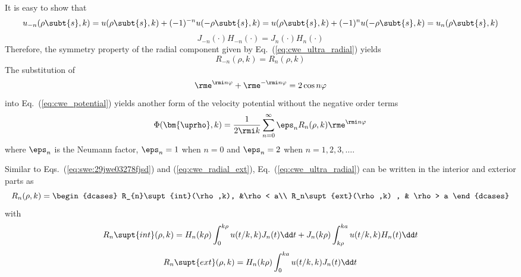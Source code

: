 It is easy to show that 
\begin{equation}
    u_{-n}(\rho\subt{s},k) = u(\rho\subt{s},k) + (-1)^{-n} u(-\rho\subt{s},k)
    = u(\rho\subt{s},k) + (-1)^n u(-\rho\subt{s},k) = u_n(\rho\subt{s},k)
    \label{eq:8923asjdf}
\end{equation}
\begin{equation}
    J_{-n}(\cdot) H_{-n}(\cdot) = J_n(\cdot)H_n(\cdot)
    \label{eq:1289fjws9d8f}
\end{equation}
Therefore, the symmetry property of the radial component given by Eq.~(\ref{eq:cwe_ultra_radial}) yields
\begin{equation}
    R_{-n}(\rho,k) = R_n(\rho,k)
    \label{eq:rad:2930fjwsd}
\end{equation}
The substitution of
\begin{equation}
    \rme^{\rmi n \varphi} + \rme^{-\rmi n \varphi } = 2\cos n\varphi
\end{equation}
into Eq.~(\ref{eq:cwe_potential}) yields another form of the velocity potential without the negative order terms
\begin{equation}
    \Phi(\bm{\uprho},k)
    =\frac{1}{2\rmi k}
    \sum_{n=0}^\infty \eps_n R_n(\rho,k)\rme^{\rmi n \varphi}
    \label{eq:2389fga9r8ef2w}
\end{equation}
where $\eps_n$ is the Neumann factor, $\eps_n = 1$ when $n=0$ and $\eps_n = 2$ when $n = 1,2,3,\ldots$.


Similar to Eqs.~(\ref{eq:swe:29jwe03278fjsd}) and (\ref{eq:cwe_radial_ext}), Eq.~(\ref{eq:cwe_ultra_radial}) can be written in the interior and exterior parts as
\begin{equation}
    R_{n}(\rho,k)
    =
    \begin{dcases}
        R_{n}\supt{int}(\rho,k), &\rho < a\\
        R_n\supt{ext}(\rho,k) , & \rho > a
    \end{dcases}
    \label{eq:ae23f90sd}
\end{equation}
with 
\begin{equation}
    R_n\supt{int}(\rho,k)
    =
    H_n(k\rho)\int_0^{k\rho }u(t/k,k)J_n(t)\dd t 
    + 
    J_n(k\rho) \int_{k\rho}^{ka} u(t/k,k) H_n(t)\dd t
    \label{eq:2390rjasd023jdfjap}
\end{equation}
\begin{equation}
    R_n\supt{ext}(\rho,k)
    =
    H_n(k\rho) \int_0^{ka} u(t/k,k) J_n(t)\dd t 
    \label{eq:cwe_radial_ext23}
\end{equation}

